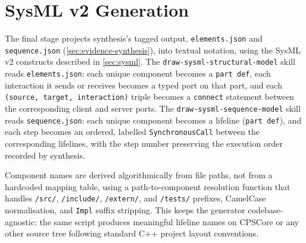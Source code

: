 \section{SysML v2 Generation}\label{sec:sysml-generation}

The final stage projects synthesis's tagged output, \texttt{elements.json}
and \texttt{sequence.json} (\cref{sec:evidence-synthesis}), into \sysml
textual notation, using the SysML v2 constructs described in
\cref{sec:sysml}. The \texttt{draw-sysml-structural-model} skill reads
\texttt{elements.json}: each unique component becomes a \texttt{part
def}, each interaction it sends or receives becomes a typed port on that
part, and each \texttt{(source, target, interaction)} triple becomes a
\texttt{connect} statement between the corresponding client and server
ports. The \texttt{draw-sysml-sequence-model} skill reads
\texttt{sequence.json}: each unique component becomes a lifeline
(\texttt{part def}), and each step becomes an ordered, labelled
\texttt{SynchronousCall} between the corresponding lifelines, with the
step number preserving the execution order recorded by synthesis.

Component names are derived algorithmically from file paths, not from a
hardcoded mapping table, using a path-to-component resolution function
that handles \texttt{/src/}, \texttt{/include/}, \texttt{/extern/}, and
\texttt{/tests/} prefixes, CamelCase normalisation, and \texttt{Impl}
suffix stripping. This keeps the generator codebase-agnostic: the same
script produces meaningful lifeline names on CPSCore or any other source
tree following standard C++ project layout conventions.
